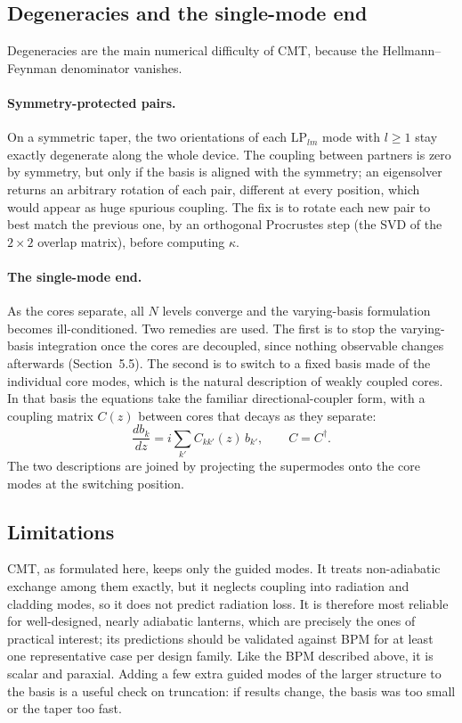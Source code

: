 \documentclass[11pt,a4paper]{article}
\begin{document}
\subsection{Degeneracies and the single-mode end}
Degeneracies are the main numerical difficulty of CMT, because the Hellmann--Feynman denominator vanishes.

\paragraph{Symmetry-protected pairs.} On a symmetric taper, the two orientations of each $\mathrm{LP}_{lm}$ mode with $l \geq 1$ stay exactly degenerate along the whole device. The coupling between partners is zero by symmetry, but only if the basis is aligned with the symmetry; an eigensolver returns an arbitrary rotation of each pair, different at every position, which would appear as huge spurious coupling. The fix is to rotate each new pair to best match the previous one, by an orthogonal Procrustes step (the SVD of the $2 \times 2$ overlap matrix), before computing $\kappa$.

\paragraph{The single-mode end.} As the cores separate, all $N$ levels converge and the varying-basis formulation becomes ill-conditioned. Two remedies are used. The first is to stop the varying-basis integration once the cores are decoupled, since nothing observable changes afterwards (Section~5.5). The second is to switch to a fixed basis made of the individual core modes, which is the natural description of weakly coupled cores. In that basis the equations take the familiar directional-coupler form, with a coupling matrix $C(z)$ between cores that decays as they separate:
\begin{equation}
\frac{d b_k}{dz} = i \sum_{k'} C_{kk'}(z)\, b_{k'},
\qquad
C = C^\dagger.
\label{eq:directional}
\end{equation}
The two descriptions are joined by projecting the supermodes onto the core modes at the switching position.

\subsection{Limitations}
CMT, as formulated here, keeps only the guided modes. It treats non-adiabatic exchange among them exactly, but it neglects coupling into radiation and cladding modes, so it does not predict radiation loss. It is therefore most reliable for well-designed, nearly adiabatic lanterns, which are precisely the ones of practical interest; its predictions should be validated against BPM for at least one representative case per design family. Like the BPM described above, it is scalar and paraxial. Adding a few extra guided modes of the larger structure to the basis is a useful check on truncation: if results change, the basis was too small or the taper too fast.
\end{document}
